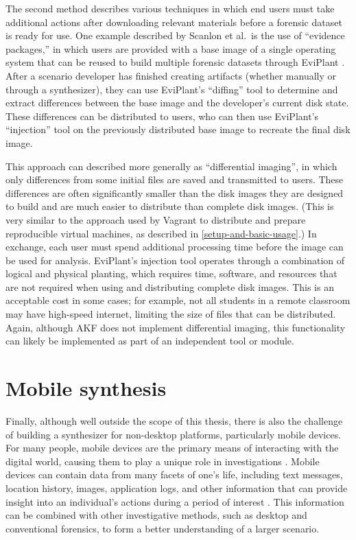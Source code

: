 \documentclass[letterpaper,12pt]{report}
\begin{document}
The second method describes various techniques in which end users must
take additional actions after downloading relevant materials before a
forensic dataset is ready for use. One example described by Scanlon et
al.~is the use of ``evidence packages,'' in which users are provided
with a base image of a single operating system that can be reused to
build multiple forensic datasets through EviPlant
\cite{scanlonEviPlantEfficientDigital2017}. After a scenario
developer has finished creating artifacts (whether manually or through a
synthesizer), they can use EviPlant's ``diffing'' tool to determine and
extract differences between the base image and the developer's current
disk state. These differences can be distributed to users, who can then
use EviPlant's ``injection'' tool on the previously distributed base
image to recreate the final disk image.

This approach can described more generally as ``differential imaging'',
in which only differences from some initial files are saved and
transmitted to users. These differences are often significantly smaller
than the disk images they are designed to build and are much easier to
distribute than complete disk images. (This is very similar to the
approach used by Vagrant to distribute and prepare reproducible virtual
machines, as described in \autoref{setup-and-basic-usage}.) In exchange, each user must spend additional
processing time before the image can be used for analysis. EviPlant's
injection tool operates through a combination of logical and physical
planting, which requires time, software, and resources that are not
required when using and distributing complete disk images. This is an
acceptable cost in some cases; for example, not all students in a remote
classroom may have high-speed internet, limiting the size of files that
can be distributed. Again, although AKF does not implement differential
imaging, this functionality can likely be implemented as part of an
independent tool or module.

\section{Mobile synthesis}\label{mobile-synthesis}

Finally, although well outside the scope of this thesis, there is also
the challenge of building a synthesizer for non-desktop platforms,
particularly mobile devices. For many people, mobile devices are the
primary means of interacting with the digital world, causing them to
play a unique role in investigations
\cite{chernyshevMobileForensicsAdvances2017}. Mobile devices can
contain data from many facets of one's life, including text messages,
location history, images, application logs, and other information that
can provide insight into an individual's actions during a period of
interest \cite{sutiknoCapabilitiesCellebriteUniversal2024}. This
information can be combined with other investigative methods, such as
desktop and conventional forensics, to form a better understanding of a
larger scenario.
\end{document}
